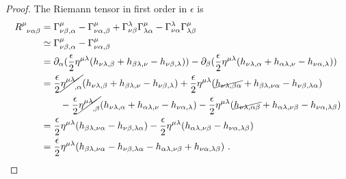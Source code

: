 \begin{proof}
        The Riemann tensor in first order in $\epsilon$ is 
        \begin{equation*}
        \begin{aligned}
            R^\mu_{\phantom \mu \nu\alpha\beta} & = \Gamma^\mu_{\nu\beta,\alpha} - \Gamma^\mu_{\nu\alpha,\beta} + \Gamma^\lambda_{\nu\beta} \Gamma^\mu_{\lambda\alpha} - \Gamma^\lambda_{\nu\alpha} \Gamma^\mu_{\lambda\beta} \\ & \simeq \Gamma^\mu_{\nu\beta,\alpha} - \Gamma^\mu_{\nu\alpha,\beta} \\ & = \partial_\alpha (\frac{\epsilon}{2} \eta^{\mu\lambda} (h_{\nu\lambda, \beta} + h_{\beta\lambda,\nu} - h_{\nu\beta,\lambda}) ) - \partial_\beta (\frac{\epsilon}{2} \eta^{\mu\lambda} (h_{\nu\lambda, \alpha} + h_{\alpha\lambda,\nu} - h_{\nu\alpha,\lambda})) \\ & = \frac{\epsilon}{2} \cancel{\eta^{\mu\lambda}_{\phantom{\mu\lambda} , \alpha}} (h_{\nu\lambda, \beta} + h_{\beta\lambda,\nu} - h_{\nu\beta,\lambda}) + \frac{\epsilon}{2} \eta^{\mu\lambda} (\cancel{h_{\nu\lambda, \beta\alpha}} + h_{\beta\lambda,\nu\alpha} - h_{\nu\beta,\lambda\alpha}) \\ & \qquad - \frac{\epsilon}{2} \cancel{\eta^{\mu\lambda}_{\phantom{\mu\lambda} , \beta}} (h_{\nu\lambda, \alpha} + h_{\alpha\lambda,\nu} - h_{\nu\alpha,\lambda}) - \frac{\epsilon}{2} \eta^{\mu\lambda} (\cancel{h_{\nu\lambda, \alpha\beta}} + h_{\alpha\lambda,\nu\beta} - h_{\nu\alpha,\lambda\beta}) \\ & = \frac{\epsilon}{2} \eta^{\mu\lambda} (h_{\beta\lambda,\nu\alpha} - h_{\nu\beta,\lambda\alpha}) - \frac{\epsilon}{2} \eta^{\mu\lambda} (h_{\alpha\lambda,\nu\beta} - h_{\nu\alpha,\lambda\beta}) \\ & = \frac{\epsilon}{2} \eta^{\mu\lambda} (h_{\beta\lambda,\nu\alpha} - h_{\nu\beta,\lambda\alpha} - h_{\alpha\lambda,\nu\beta} + h_{\nu\alpha,\lambda\beta}) ~.
        \end{aligned}
        \end{equation*}


\end{proof}
